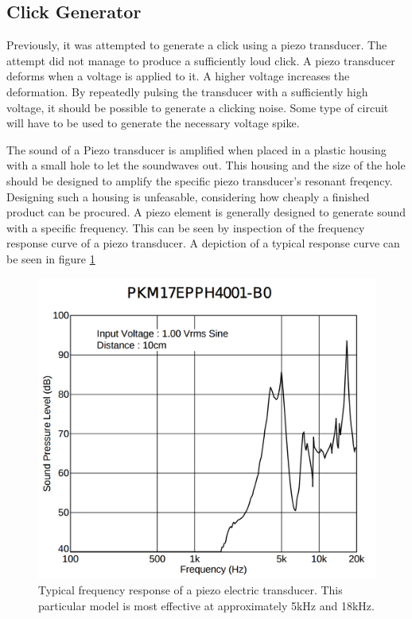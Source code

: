 \subsection{Click Generator} %
\label{sub:click_generator}
Previously, it was attempted to generate a click using a piezo transducer.
The attempt did not manage to produce a sufficiently loud click.
A piezo transducer deforms when a voltage is applied to it.
A higher voltage increases the deformation.
By repeatedly pulsing the transducer with a sufficiently high voltage, it should be possible to generate a clicking noise.
Some type of circuit will have to be used to generate the necessary voltage spike.

The sound of a Piezo transducer is amplified when placed in a plastic housing with a small hole to let the soundwaves out.
This housing and the size of the hole should be designed to amplify the specific piezo transducer's resonant freqency.
Designing such a housing is unfeasable, considering how cheaply a finished product can be procured.
A piezo element is generally designed to generate sound with a specific frequency.
This can be seen by inspection of the frequency response curve of a piezo transducer.
A depiction of a typical response curve can be seen in figure \ref{fig:piezo_response}

\begin{figure}
	\centering
	\includegraphics[width=.5\linewidth]{graphics/piezo_response.png}
	\caption{Typical frequency response of a piezo electric transducer. This particular model is most effective at approximately 5kHz and 18kHz.}
	\label{fig:piezo_response}
\end{figure}

